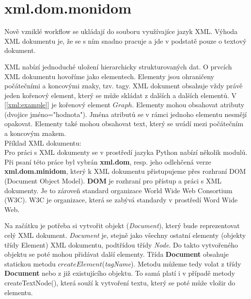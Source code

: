 \newpage

\section{xml.dom.monidom}
\nocite{python:www}
\nocite{py3:book}

Nově vzniklé workflow se ukládají do souboru využívajíce jazyk  XML. Výhoda XML dokumentu je, že se s ním snadno pracuje a jde v podstatě pouze o textový dokument.

XML nabízí jednoduché uložení hierarchicky strukturovaných dat. O prvcích XML dokumentu hovoříme jako elementech. Elementy jsou ohraničeny počátečními a koncovými znaky, tzv. tagy. XML dokument obsahuje vždy právě jeden kořenový element, který se může skládat z dalších a dalších elementů. V [\autoref{xml:example}] je kořenový element $Graph$. Elementy mohou obsahovat atributy (dvojice jméno="hodnota").  Jména atributů se v rámci jednoho elementu nesmějí opakovat. Elementy také mohou obsahovat text, který se uvádí mezi počátečním a koncovým znakem. \\

\noindent Příklad XML dokumentu$:$ \\



Pro práci s XML dokumenty se v prostředí jazyka Python nabízí několik modulů. Při psaní této práce byl vybrán  \textbf{xml.dom}, resp. jeho odlehčená verze  \textbf{xml.dom.minidom}, který k XML dokumentu přistupujeme přes rozhraní DOM (Document Object Model).  \textbf{DOM}  je rozhraní pro přístup a práci s XML dokumenty. Je to zároveň standard organizace World Wide Web Consortium (W3C). W3C je organizace, která se zabývá standardy v prostředí Word Wide Web.

Na začátku je potřeba si vytvořit objekt (\textit{Document}), který bude reprezentovat celý XML dokument. \textit{Document} je, stejně jako všechny ostatní elementy (objekty třídy Element) XML dokumentu, podtřídou třídy \textit{Node}. Do takto vytvořeného objektu se poté mohou přidávat další elementy. Třída \textbf{Document} obsahuje statickou metodu $createElement$(\textit{tagName}). Metodu můžeme tedy volat z třídy \textbf{Document} nebo z již existujícího objektu. To samá platí i v případě metody createTextNode(), která souží k vytvoření textu, který se poté může vložir do elementu.

